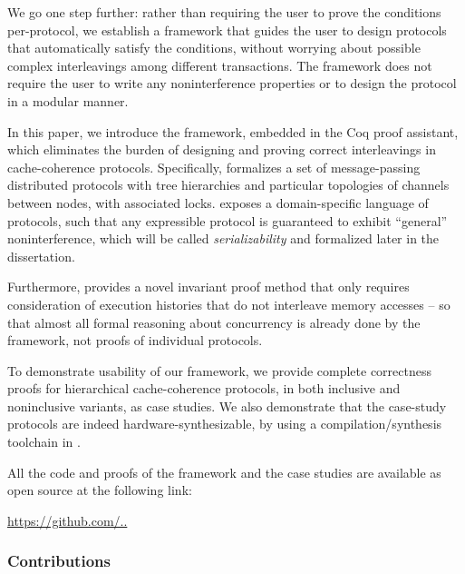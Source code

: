 We go one step further: rather than requiring the user to prove the conditions per-protocol, we establish a framework that guides the user to design protocols that automatically satisfy the conditions, without worrying about possible complex interleavings among different transactions.
The framework does not require the user to write any noninterference properties or to design the protocol in a modular manner.

In this paper, we introduce the \hemiola{} framework, embedded in the Coq proof assistant, which eliminates the burden of designing and proving correct interleavings in cache-coherence protocols.
Specifically, \hemiola{} formalizes a set of message-passing distributed protocols with tree hierarchies and particular topologies of channels between nodes, with associated locks.
\hemiola{} exposes a domain-specific language of protocols, such that any expressible protocol is guaranteed to exhibit ``general'' noninterference, which will be called \emph{serializability} and formalized later in the dissertation.

Furthermore, \hemiola{} provides a novel invariant proof method that only requires consideration of execution histories that do not interleave memory accesses -- so that almost all formal reasoning about concurrency is already done by the framework, not proofs of individual protocols.

To demonstrate usability of our framework, we provide complete correctness proofs for hierarchical cache-coherence protocols, in both inclusive and noninclusive variants, as case studies.
We also demonstrate that the case-study protocols are indeed hardware-synthesizable, by using a compilation/synthesis toolchain in \hemiola{}.

All the code and proofs of the framework and the case studies are available as open source at the following link:
\begin{center}
  \url{https://github.com/..}
\end{center}

\subsubsection{Contributions}

